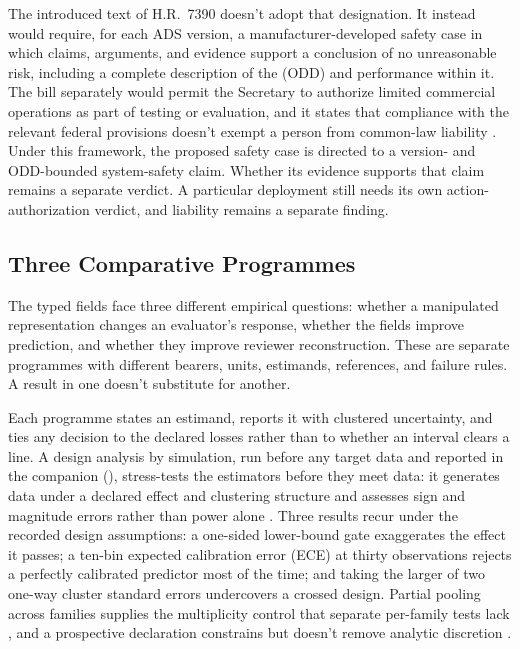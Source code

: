 The introduced text of H.R.~7390 doesn't adopt that designation. It instead would require, for each ADS version, a manufacturer-developed safety case in which claims, arguments, and evidence support a conclusion of no unreasonable risk, including a complete description of the  (ODD) and performance within it. The bill separately would permit the Secretary to authorize limited commercial operations as part of testing or evaluation, and it states that compliance with the relevant federal provisions doesn't exempt a person from common-law liability \parencite{usCongress2026selfDriveAct}. Under this framework, the proposed safety case is directed to a version- and ODD-bounded system-safety claim. Whether its evidence supports that claim remains a separate verdict. A particular deployment still needs its own action-authorization verdict, and liability remains a separate finding.

\subsection{Three Comparative Programmes}
\label{sec:comparative-test}

The typed fields face three different empirical questions: whether a manipulated representation changes an evaluator's response, whether the fields improve prediction, and whether they improve reviewer reconstruction. These are separate programmes with different bearers, units, estimands, references, and failure rules. A result in one doesn't substitute for another.

Each programme states an estimand, reports it with clustered uncertainty, and ties any decision to the declared losses rather than to whether an interval clears a line. A design analysis by simulation, run before any target data and reported in the companion (), stress-tests the estimators before they meet data: it generates data under a declared effect and clustering structure and assesses sign and magnitude errors rather than power alone \citep{gelman2014types}. Three results recur under the recorded design assumptions: a one-sided lower-bound gate exaggerates the effect it passes; a ten-bin expected calibration error (ECE) at thirty observations rejects a perfectly calibrated predictor most of the time; and taking the larger of two one-way cluster standard errors undercovers a crossed design. Partial pooling across families supplies the multiplicity control that separate per-family tests lack \citep{gelmanHillYajima2012,gelmanHill2007}, and a prospective declaration constrains but doesn't remove analytic discretion \citep{gelman2014statcrisis}.

